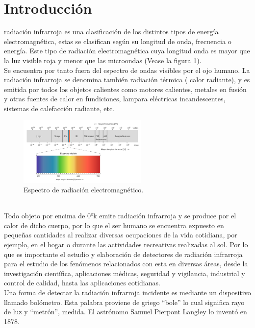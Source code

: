 \documentclass[a4paper,journal]{IEEEtran}
\begin{document}
\section{Introducción}
 radiación infrarroja es una clasificación de los distintos tipos de energía electromagnética, estas se clasifican según su longitud de onda, frecuencia o energía. Este tipo de radiación electromagnética cuya longitud onda es mayor que la luz visible roja y menor que las microondas (Vease la figura 1).\\
Se encuentra por tanto fuera del espectro de ondas visibles por el ojo humano. La radiación infrarroja se denomina también radiación térmica ( calor radiante), y es emitida por todos los objetos calientes como motores calientes, metales en fusión y otras fuentes de calor en fundiciones, lampara eléctricas incandescentes, sistemas de calefacción radiante, etc.
\begin{figure}[h]
\centering
\includegraphics[width=2.5in]{spectre}
\caption{Espectro de radiación electromagnético.}
\label{spectre}
\end{figure}
\\ 
Todo objeto por encima de 0°k emite radiación infrarroja y se produce por el calor de dicho cuerpo, por lo que el ser humano se encuentra expuesto en pequeñas cantidades al realizar diversas ocupaciones de la vida cotidiana, por ejemplo, en el hogar o durante las actividades recreativas realizadas al sol. Por lo que es importante el estudio y elaboración de detectores de radiación infrarroja para el estudio de los fenómenos relacionados con esta en diversas áreas, desde la investigación científica, aplicaciones médicas, seguridad y vigilancia, industrial y control de calidad, hasta las aplicaciones cotidianas.
\\
Una forma de detectar la radiación infrarroja incidente es mediante un dispositivo llamado bolómetro. Esta palabra proviene de griego “bole” lo cual significa rayo de luz y “metrón”, medida. El astrónomo Samuel Pierpont Langley lo inventó en 1878.
\\

\end{document}

